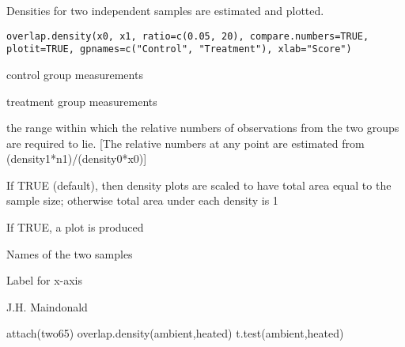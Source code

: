 \begin{Description}\relax
Densities for two independent samples are estimated and plotted.
\end{Description}
\begin{Usage}
\begin{verbatim}
overlap.density(x0, x1, ratio=c(0.05, 20), compare.numbers=TRUE, 
plotit=TRUE, gpnames=c("Control", "Treatment"), xlab="Score")
\end{verbatim}
\end{Usage}
\begin{Arguments}
\begin{ldescription}
\item[\code{x0}] control group measurements
\item[\code{x1}] treatment group measurements
\item[\code{ratio}] the range within which the relative numbers of
observations from the two groups are
required to lie.  [The relative numbers at
any point are estimated from (density1*n1)/(density0*x0)]
\item[\code{compare.numbers}] If TRUE (default), then density plots
are scaled to have total area equal to the sample size; otherwise
total area under each density is 1
\item[\code{plotit}] If TRUE, a plot is produced
\item[\code{gpnames}] Names of the two samples
\item[\code{xlab}] Label for x-axis
\end{ldescription}
\end{Arguments}
\begin{Author}\relax
J.H. Maindonald
\end{Author}
\begin{SeeAlso}\relax
{}
\end{SeeAlso}
\begin{Examples}
\begin{ExampleCode}
attach(two65)
overlap.density(ambient,heated)
t.test(ambient,heated)
\end{ExampleCode}
\end{Examples}

